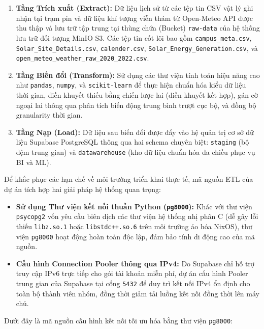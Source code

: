 \documentclass[12pt, a4paper]{report}
\begin{document}
\begin{enumerate}[noitemsep]
    \item \textbf{Tầng Trích xuất (Extract):} Dữ liệu lịch sử từ các tệp tin CSV vật lý ghi nhận tại trạm pin và dữ liệu khí tượng viễn thám từ Open-Meteo API được thu thập và lưu trữ tập trung tại thùng chứa (Bucket) \texttt{raw-data} của hệ thống lưu trữ đối tượng MinIO S3. Các tệp tin cốt lõi bao gồm \texttt{campus\_meta.csv}, \texttt{Solar\_Site\_Details.csv}, \texttt{calender.csv}, \texttt{Solar\_Energy\_Generation.csv}, và \texttt{open\_meteo\_weather\_raw\_2020\_2022.csv}.
    \item \textbf{Tầng Biến đổi (Transform):} Sử dụng các thư viện tính toán hiệu năng cao như \texttt{pandas}, \texttt{numpy}, và \texttt{scikit-learn} để thực hiện chuẩn hóa kiểu dữ liệu thời gian, điền khuyết thiếu bằng chiến lược lai (điền khuyết kết hợp), gán cờ ngoại lai thông qua phân tích biến động trung bình trượt cục bộ, và đồng bộ granularity thời gian.
    \item \textbf{Tầng Nạp (Load):} Dữ liệu sau biến đổi được đẩy vào hệ quản trị cơ sở dữ liệu Supabase PostgreSQL thông qua hai schema chuyên biệt: \texttt{staging} (bộ đệm trung gian) và \texttt{datawarehouse} (kho dữ liệu chuẩn hóa đa chiều phục vụ BI và ML).
\end{enumerate}

Để khắc phục các hạn chế về môi trường triển khai thực tế, mã nguồn ETL của dự án tích hợp hai giải pháp hệ thống quan trọng:
\begin{itemize}
    \item \textbf{Sử dụng Thư viện kết nối thuần Python (\texttt{pg8000}):} Khác với thư viện \texttt{psycopg2} vốn yêu cầu biên dịch các thư viện hệ thống nhị phân C (dễ gây lỗi thiếu \texttt{libz.so.1} hoặc \texttt{libstdc++.so.6} trên môi trường ảo hóa NixOS), thư viện \texttt{pg8000} hoạt động hoàn toàn độc lập, đảm bảo tính di động cao của mã nguồn.
    \item \textbf{Cấu hình Connection Pooler thông qua IPv4:} Do Supabase chỉ hỗ trợ truy cập IPv6 trực tiếp cho gói tài khoản miễn phí, dự án cấu hình Pooler trung gian của Supabase tại cổng \texttt{5432} để duy trì kết nối IPv4 ổn định cho toàn bộ thành viên nhóm, đồng thời giảm tải luồng kết nối đồng thời lên máy chủ.
\end{itemize}

Dưới đây là mã nguồn cấu hình kết nối tối ưu hóa bằng thư viện \texttt{pg8000}:
\end{document}
